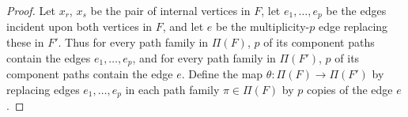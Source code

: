 \documentclass[12pt]{amsart}
\theoremstyle{definition}
\numberwithin{equation}{section}
\newcommand{\ctr}[1]{{x}_{#1}}
\begin{document}
\begin{proof}
    Let $\ctr r$, $\ctr s$ be the pair of internal vertices in $F$, let $e_1, \dots, e_p$ be the edges incident upon both vertices
    in $F$, and let $e$ be the multiplicity-$p$ edge replacing these in $F'$.
    Thus for every path family 
    in $\Pi(F)$,
    $p$ of its component paths contain the edges $e_1,\dotsc, e_p$,
    and for every path family in $\Pi(F')$,
    $p$ of its component paths contain the edge $e$.
    Define the map 
        $\theta : \Pi(F) \rightarrow \Pi(F')$
        by replacing edges $e_1,\dotsc, e_p$ in each path family $\pi \in \Pi(F)$ by $p$ copies of the edge $e$.
        

\end{proof}
\end{document}
